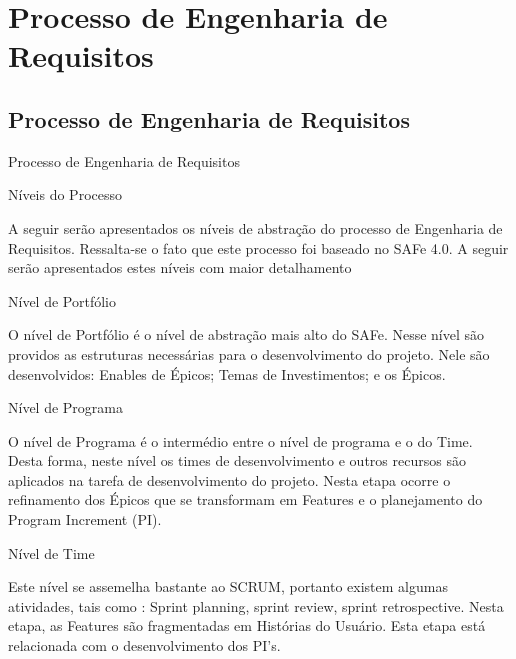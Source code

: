 \part{Processo de Engenharia de Requisitos}

\chapter[Processo de Engenharia de Requisitos]{Processo de Engenharia de Requisitos}
{
	\large{Processo de Engenharia de Requisitos\\}

}

{
	\large{Níveis do Processo\\}

	\tab A seguir serão apresentados os níveis de abstração do processo de Engenharia de Requisitos. Ressalta-se o fato que este processo foi baseado no SAFe 4.0. A seguir serão apresentados estes níveis com maior detalhamento\\ 

}

{
	\large{Nível de Portfólio\\}

	\tab O nível de Portfólio é o nível de abstração mais alto do SAFe. Nesse nível são providos as estruturas necessárias para o desenvolvimento do projeto.  Nele são desenvolvidos: Enables de Épicos; Temas de Investimentos; e os Épicos. \\

}

{
	 \large{Nível de Programa\\}

	 \tab O nível de Programa é o intermédio entre o nível de programa e o do Time. Desta forma, neste nível os times de desenvolvimento e outros recursos são aplicados na tarefa de desenvolvimento do projeto.  Nesta etapa ocorre o refinamento dos Épicos que se transformam em Features e o planejamento do Program Increment (PI).\\
}

{
	\large{Nível de Time\\}

	\tab Este nível se assemelha bastante ao SCRUM,  portanto existem algumas atividades, tais como : Sprint planning, sprint review, sprint retrospective. Nesta etapa, as Features são fragmentadas em Histórias do Usuário. Esta etapa está relacionada com o desenvolvimento dos PI’s. \\
}

